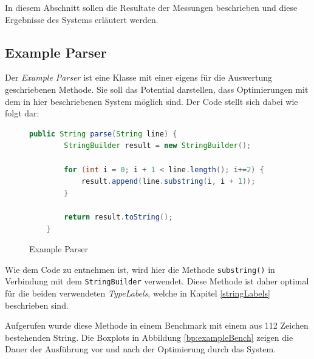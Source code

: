 In diesem Abschnitt sollen die Resultate der Messungen beschrieben und diese
 Ergebnisse des Systems erläutert werden.

\subsection{Example Parser}

Der \textit{Example Parser} ist eine Klasse mit einer eigens für die Auswertung geschriebenen Methode.
Sie soll das Potential darstellen, dass Optimierungen mit dem in hier beschriebenen
System möglich sind. Der Code stellt sich dabei wie folgt dar:

\begin{figure}[H]
	\begin{lstlisting}[language=Java]
	public String parse(String line) {
		StringBuilder result = new StringBuilder();

		for (int i = 0; i + 1 < line.length(); i+=2) {
			result.append(line.substring(i, i + 1));
		}

		return result.toString();
	}
	\end{lstlisting} 
	\caption{Example Parser}
\end{figure}

Wie dem Code zu entnehmen ist, wird hier die Methode \texttt{substring()} in 
Verbindung mit dem \texttt{StringBuilder} verwendet. Diese Methode ist daher
optimal für die beiden verwendeten \textit{TypeLabels}, welche in Kapitel \ref{stringLabels} 
beschrieben sind. 

Aufgerufen wurde diese Methode in einem Benchmark mit einem aus 112 Zeichen bestehenden 
String. Die 
Boxplots in Abbildung \ref{bp:exampleBench} zeigen die Dauer der Ausführung
vor und nach der Optimierung durch das System. 

